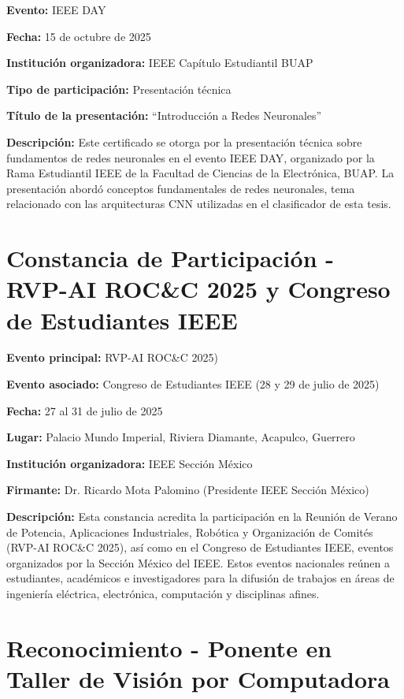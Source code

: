 \textbf{Evento:} IEEE DAY

\textbf{Fecha:} 15 de octubre de 2025

\textbf{Institución organizadora:} IEEE Capítulo Estudiantil BUAP

\textbf{Tipo de participación:} Presentación técnica

\textbf{Título de la presentación:} ``Introducción a Redes Neuronales''

\textbf{Descripción:} Este certificado se otorga por la presentación técnica sobre fundamentos de redes neuronales en el evento IEEE DAY, organizado por la Rama Estudiantil IEEE de la Facultad de Ciencias de la Electrónica, BUAP. La presentación abordó conceptos fundamentales de redes neuronales, tema relacionado con las arquitecturas CNN utilizadas en el clasificador de esta tesis.



\section{Constancia de Participación - RVP-AI ROC\&C 2025 y Congreso de Estudiantes IEEE}

\textbf{Evento principal:} RVP-AI ROC\&C 2025)

\textbf{Evento asociado:} Congreso de Estudiantes IEEE (28 y 29 de julio de 2025)

\textbf{Fecha:} 27 al 31 de julio de 2025

\textbf{Lugar:} Palacio Mundo Imperial, Riviera Diamante, Acapulco, Guerrero

\textbf{Institución organizadora:} IEEE Sección México

\textbf{Firmante:} Dr. Ricardo Mota Palomino (Presidente IEEE Sección México)

\textbf{Descripción:} Esta constancia acredita la participación en la Reunión de Verano de Potencia, Aplicaciones Industriales, Robótica y Organización de Comités (RVP-AI ROC\&C 2025), así como en el Congreso de Estudiantes IEEE, eventos organizados por la Sección México del IEEE. Estos eventos nacionales reúnen a estudiantes, académicos e investigadores para la difusión de trabajos en áreas de ingeniería eléctrica, electrónica, computación y disciplinas afines.



\section{Reconocimiento - Ponente en Taller de Visión por Computadora}

